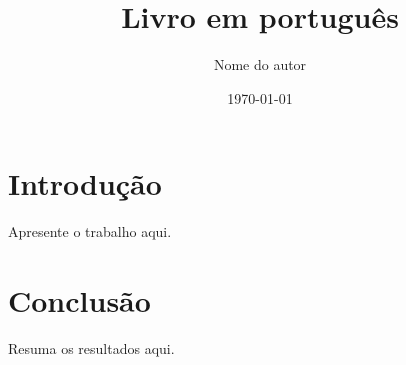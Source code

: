 \documentclass[11pt]{book}
\title{Livro em português}
\author{Nome do autor}
\date{\today}
\begin{document}
\maketitle
\tableofcontents

\chapter{Introdução}
Apresente o trabalho aqui.

\chapter{Conclusão}
Resuma os resultados aqui.
\end{document}

